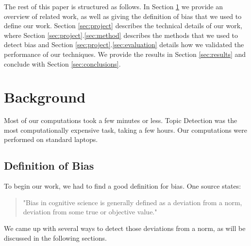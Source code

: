 \documentclass[final]{ieee}
\begin{document}
The rest of this paper is structured as follows. In Section \ref{sec:background} we provide an overview of related work, as well as giving the definition of bias that we used to define our work. Section \ref{sec:project} describes the technical details of our work, where Section \ref{sec:project}.\ref{sec:method} describes the methods that we used to detect bias and Section \ref{sec:project}.\ref{sec:evaluation} details how we validated the performance of our techniques. We provide the results in Section \ref{sec:results} and conclude with Section \ref{sec:conclusions}. 

     

            
            
\section{Background}\label{sec:background}

Most of our computations took a few minutes or less. Topic Detection was the most computationally expensive task, taking a few hours. Our computations were performed on standard laptops.

\subsection{Definition of Bias}\label{sec:definition}
To begin our work, we had to find a good definition for bias. One source\cite{Caverni90} states:
  \begin{quotation}
    "Bias in cognitive science is generally defined as a deviation from a norm, deviation from some true or objective value."
  \end{quotation}
We came up with several ways to detect those deviations from a norm, as will be discussed in the following sections.


%            
%
\end{document}
